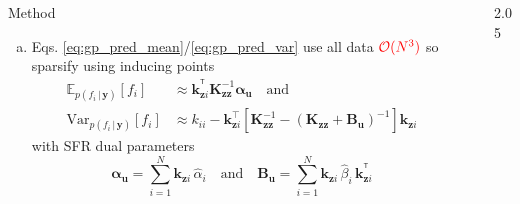 \documentclass[final,12pt]{beamer}
\newlength{\sepwidth}
\newlength{\colwidth}
\newcommand{\separatorcolumn}{\begin{column}{\sepwidth}\end{column}}
\newcommand{\mathbold}[1]{\bm{#1}}
\newcommand{\mbf}[1]{\mathbf{#1}}
\newcommand{\T}{^\mathsf{T}}
\newcommand{\valpha}[0]{\mathbold{\alpha}}
\renewcommand{\mid}{\,|\,}
\newcommand{\vu}{\mbf{u}}
\newcommand{\vw}{\mbf{w}}
\newcommand{\vy}{\mbf{y}}
\newcommand{\vz}{\mbf{z}}
\newcommand{\MKzz}{\mbf{K}_{\mbf{z}\mbf{z}}}
\newcommand{\vkzi}{\mbf{k}_{\mbf{z}i}}
\newcommand{\vkzs}{\mbf{k}_{\mbf{z}i}}
\newcommand{\MBeta}[0]{\mathbold{B}}
\newcommand{\R}{\mathbb{R}}
\newcommand{\myexpect}{\mathbb{E}}
\begin{document}
\begin{frame}[t]
\begin{columns}[t]
\begin{column}{\colwidth}
\begin{block}{Method}
  \begin{enumerate}[(a)]
    \item Eqs. \ref{eq:gp_pred_mean}/\ref{eq:gp_pred_var} use all data $\color{red}{\mathcal{O}(N^3)}$ so sparsify using inducing points %
            \begin{align}
            \myexpect_{p(f_i \mid\vy)}[f_i] &\approx   \vkzs^{\T} \MKzz^{-1} \valpha_{\vu}
            \quad \text{and} \\
            \mathrm{Var}_{p(f_i \mid \vy)}[f_i] &\approx  k_{ii} - \vkzs^\top [\MKzz^{-1} - (\MKzz + \MBeta_{\vu})^{-1} ]\vkzs
            \end{align}
            with \alert{SFR dual parameters} %
            \begin{equation}
            \valpha_{\vu}  =  \sum_{i=1}^N  \vkzi \, \hat{\alpha}_{i} %
            \quad \text{and} \quad
            \MBeta_{\vu} =  \sum_{i=1}^N \vkzi \,\hat{\beta}_{i} \, \vkzi^{\T} %
            \end{equation}
    \end{enumerate}

  \end{block}

\end{column}

\separatorcolumn

\begin{column}{2.05\colwidth}

\begin{minipage}{\textwidth}





\end{minipage}
\end{column}
\end{columns}
\end{frame}
\end{document}
